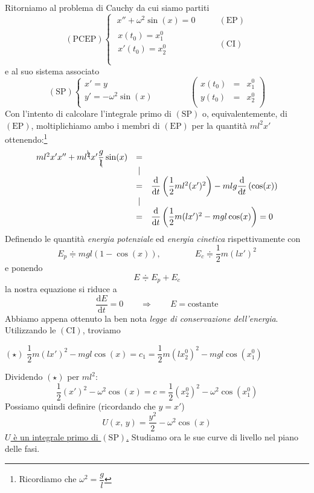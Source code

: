 Ritorniamo al problema di Cauchy da cui siamo partiti
$$
\mathrm{(PCEP)}
\begin{cases}
\; x'' + \omega^2\sin(x) = 0 &\qquad \mathrm{(EP)}\\
\begin{array}{l}
x(t_0) = x_1^0\\
x'(t_0) = x_2^0\\
\end{array}
 &\qquad \mathrm{(CI)}\\
\end{cases}
$$
e al suo sistema associato
$$
\mathrm{(SP)}
\begin{cases}
x' = y\\
y' = -\omega^2\sin(x)\\
\end{cases}
\qquad \qquad
\left(
\begin{array}{rcl}
x(t_0) &=& x_1^0\\
y(t_0) &=& x_2^0\\
\end{array}
\right)
$$
Con l'intento di calcolare l'integrale primo di $\mathrm{(SP)}$ o, equivalentemente, di $\mathrm{(EP)}$, moltiplichiamo ambo i membri di $\mathrm{(EP)}$ per la quantità $ml^2x'$ ottenendo:\footnote{Ricordiamo che $\omega^2 = \dfrac{g}{l}$}
$$
\begin{array}{rcl}
ml^2x'x'' + ml^{\bcancel{2}}x'\dfrac{g}{\bcancel{l}}\sin(x) &=& \\
& \lvert & \\
&=& \dfrac{\mathrm{d}}{\mathrm{d}t}\left( \dfrac{1}{2}ml^2(x')^2 \right) -mlg \dfrac{\mathrm{d}}{\mathrm{d}t}\left( \cos(x) \right)\\
& \lvert & \\
&=& \dfrac{\mathrm{d}}{\mathrm{d}t}\left( \dfrac{1}{2}m(lx')^2 -mgl \cos(x) \right) = 0\\
\end{array}
$$
Definendo le quantità \emph{energia potenziale} ed \emph{energia cinetica} rispettivamente con
$$
E_p \doteqdot mgl(1-\cos(x)), \qquad\qquad E_c \doteqdot \dfrac{1}{2}m(lx')^2
$$
e ponendo
$$
E \doteqdot E_p + E_c
$$
la nostra equazione si riduce a
$$
\dfrac{\mathrm{d}E}{\mathrm{d}t} = 0
\qquad\Longrightarrow\qquad
E = \text{costante}
$$
Abbiamo appena ottenuto la ben nota \emph{legge di conservazione dell'energia}. Utilizzando le $\mathrm{(CI)}$, troviamo
\begin{center}
$\mathrm{(\star)}$
\hfill
$\displaystyle
\dfrac{1}{2}m(lx')^2 - mgl\cos(x) = c_1 = \dfrac{1}{2}m(lx_2^0)^2 - mgl\cos(x_1^0)
$
\hfill \null \\
\end{center}
Dividendo $\mathrm{(\star)}$ per $ml^2$:
$$
\dfrac{1}{2}(x')^2 - \omega^2\cos(x) = c = \dfrac{1}{2}(x_2^0)^2 - \omega^2\cos(x_1^0)
$$
Possiamo quindi definire (ricordando che $y = x'$)
$$
U(x,\,y) = \dfrac{y^2}{2} - \omega^2\cos(x)
$$
\underline{$U$ è un integrale primo di $\mathrm{(SP)}$.} Studiamo ora le sue curve di livello nel piano delle fasi.

